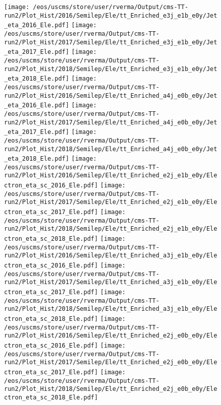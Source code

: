 \begin{figure}
\centering
\texttt{[image: /eos/uscms/store/user/rverma/Output/cms-TT-run2/Plot\_Hist/2016/Semilep/Ele/tt\_Enriched\_e3j\_e1b\_e0y/Jet\_eta\_2016\_Ele.pdf]}
\texttt{[image: /eos/uscms/store/user/rverma/Output/cms-TT-run2/Plot\_Hist/2017/Semilep/Ele/tt\_Enriched\_e3j\_e1b\_e0y/Jet\_eta\_2017\_Ele.pdf]}
\texttt{[image: /eos/uscms/store/user/rverma/Output/cms-TT-run2/Plot\_Hist/2018/Semilep/Ele/tt\_Enriched\_e3j\_e1b\_e0y/Jet\_eta\_2018\_Ele.pdf]}
\texttt{[image: /eos/uscms/store/user/rverma/Output/cms-TT-run2/Plot\_Hist/2016/Semilep/Ele/tt\_Enriched\_a4j\_e0b\_e0y/Jet\_eta\_2016\_Ele.pdf]}
\texttt{[image: /eos/uscms/store/user/rverma/Output/cms-TT-run2/Plot\_Hist/2017/Semilep/Ele/tt\_Enriched\_a4j\_e0b\_e0y/Jet\_eta\_2017\_Ele.pdf]}
\texttt{[image: /eos/uscms/store/user/rverma/Output/cms-TT-run2/Plot\_Hist/2018/Semilep/Ele/tt\_Enriched\_a4j\_e0b\_e0y/Jet\_eta\_2018\_Ele.pdf]}
\texttt{[image: /eos/uscms/store/user/rverma/Output/cms-TT-run2/Plot\_Hist/2016/Semilep/Ele/tt\_Enriched\_e2j\_e1b\_e0y/Electron\_eta\_sc\_2016\_Ele.pdf]}
\texttt{[image: /eos/uscms/store/user/rverma/Output/cms-TT-run2/Plot\_Hist/2017/Semilep/Ele/tt\_Enriched\_e2j\_e1b\_e0y/Electron\_eta\_sc\_2017\_Ele.pdf]}
\texttt{[image: /eos/uscms/store/user/rverma/Output/cms-TT-run2/Plot\_Hist/2018/Semilep/Ele/tt\_Enriched\_e2j\_e1b\_e0y/Electron\_eta\_sc\_2018\_Ele.pdf]}
\texttt{[image: /eos/uscms/store/user/rverma/Output/cms-TT-run2/Plot\_Hist/2016/Semilep/Ele/tt\_Enriched\_a3j\_e1b\_e0y/Electron\_eta\_sc\_2016\_Ele.pdf]}
\texttt{[image: /eos/uscms/store/user/rverma/Output/cms-TT-run2/Plot\_Hist/2017/Semilep/Ele/tt\_Enriched\_a3j\_e1b\_e0y/Electron\_eta\_sc\_2017\_Ele.pdf]}
\texttt{[image: /eos/uscms/store/user/rverma/Output/cms-TT-run2/Plot\_Hist/2018/Semilep/Ele/tt\_Enriched\_a3j\_e1b\_e0y/Electron\_eta\_sc\_2018\_Ele.pdf]}
\texttt{[image: /eos/uscms/store/user/rverma/Output/cms-TT-run2/Plot\_Hist/2016/Semilep/Ele/tt\_Enriched\_e2j\_e0b\_e0y/Electron\_eta\_sc\_2016\_Ele.pdf]}
\texttt{[image: /eos/uscms/store/user/rverma/Output/cms-TT-run2/Plot\_Hist/2017/Semilep/Ele/tt\_Enriched\_e2j\_e0b\_e0y/Electron\_eta\_sc\_2017\_Ele.pdf]}
\texttt{[image: /eos/uscms/store/user/rverma/Output/cms-TT-run2/Plot\_Hist/2018/Semilep/Ele/tt\_Enriched\_e2j\_e0b\_e0y/Electron\_eta\_sc\_2018\_Ele.pdf]}
\end{figure}


